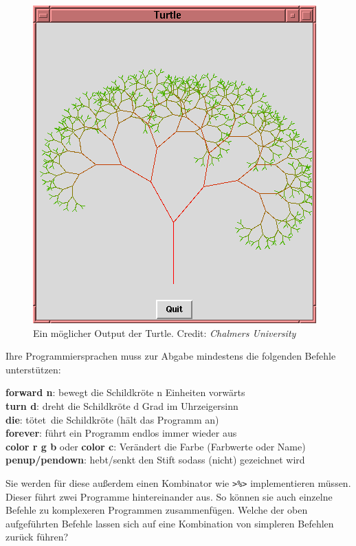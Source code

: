 \documentclass[10pt,a4paper]{article}
\begin{document}
\begin{figure}
  \vspace{-22pt}
  \begin{center}
    \includegraphics[scale=0.35]{turtle-tree.png} 
  \end{center}
  \vspace{-10pt}
  \caption{Ein möglicher Output der Turtle. Credit: \emph{Chalmers University}}
  \vspace{-40pt}
\end{figure}

Ihre Programmiersprachen muss zur Abgabe mindestens die folgenden Befehle unterstützen:
\smallskip\smallskip\smallskip

\textbf{forward n}: bewegt die Schildkröte n Einheiten vorwärts\\
\textbf{turn d}: dreht die Schildkröte d Grad im Uhrzeigersinn\\
\textbf{die}: \glqq tötet\grqq\ die Schildkröte (hält das Programm an)\\
\textbf{forever}: führt ein Programm endlos immer wieder aus\\
\textbf{color r g b} oder \textbf{color c}: Verändert die Farbe (Farbwerte oder Name)\\
\textbf{penup/pendown}: hebt/senkt den Stift sodass (nicht) gezeichnet wird
\smallskip\smallskip\smallskip

Sie werden für diese außerdem einen Kombinator wie \texttt{>\%>} implementieren müssen. Dieser führt zwei Programme hintereinander aus. So können sie auch einzelne Befehle zu
komplexeren Programmen zusammenfügen. Welche der oben aufgeführten Befehle lassen sich auf eine Kombination
von simpleren Befehlen zurück führen?
\end{document}
